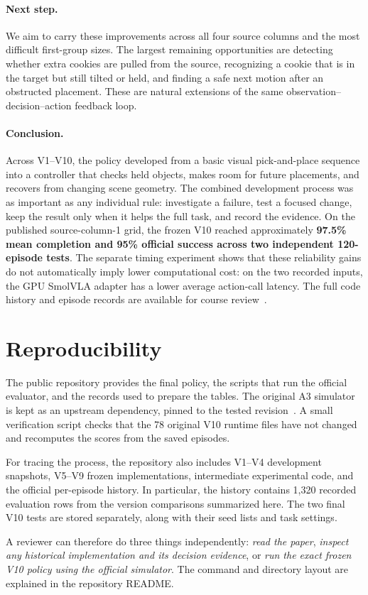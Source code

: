 \paragraph{Next step.}
We aim to carry these improvements across all four source columns and the most difficult first-group sizes. The largest remaining opportunities are detecting whether extra cookies are pulled from the source, recognizing a cookie that is in the target but still tilted or held, and finding a safe next motion after an obstructed placement. These are natural extensions of the same observation--decision--action feedback loop.

\paragraph{Conclusion.}
Across V1--V10, the policy developed from a basic visual pick-and-place sequence into a controller that checks held objects, makes room for future placements, and recovers from changing scene geometry. The combined development process was as important as any individual rule: investigate a failure, test a focused change, keep the result only when it helps the full task, and record the evidence. On the published source-column-1 grid, the frozen V10 reached approximately \textbf{97.5\% mean completion and 95\% official success across two independent 120-episode tests}. The separate timing experiment shows that these reliability gains do not automatically imply lower computational cost: on the two recorded inputs, the GPU SmolVLA adapter has a lower average action-call latency. The full code history and episode records are available for course review~\cite{ourrepo}.

\section{Reproducibility}
\label{sec:reproducibility}
The public repository provides the final policy, the scripts that run the official evaluator, and the records used to prepare the tables. The original A3 simulator is kept as an upstream dependency, pinned to the tested revision~\cite{a3}. A small verification script checks that the 78 original V10 runtime files have not changed and recomputes the scores from the saved episodes.

For tracing the process, the repository also includes V1--V4 development snapshots, V5--V9 frozen implementations, intermediate experimental code, and the official per-episode history. In particular, the history contains 1,320 recorded evaluation rows from the version comparisons summarized here. The two final V10 tests are stored separately, along with their seed lists and task settings.

A reviewer can therefore do three things independently: \emph{read the paper}, \emph{inspect any historical implementation and its decision evidence}, or \emph{run the exact frozen V10 policy using the official simulator}. The command and directory layout are explained in the repository README.
